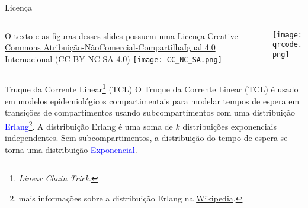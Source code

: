 \maketitle

\begin{frame}{Licença}
    \begin{columns}
        \begin{column}{0.5\textwidth}
            O texto e as figuras desses slides possuem uma
            \href{https://creativecommons.org/licenses/by-nc-sa/4.0/deed.pt}{Licença
            Creative Commons
            Atribuição-NãoComercial-CompartilhaIgual 4.0 Internacional (CC BY-NC-SA 4.0)}
            \vfill
            \centering
            \vspace{1em}
            \texttt{[image: CC\_NC\_SA.png]}
        \end{column}
        \begin{column}{0.5\textwidth}
            \centering
            \texttt{[image: qrcode.png]}
        \end{column}
    \end{columns}
    \vfill
\end{frame}

\begin{frame}{Truque da Corrente Linear\footnote{\textit{Linear Chain Trick}.} (TCL)}
	O Truque da Corrente Linear (TCL) \parencite{hurtadoGeneralizationsLinearChain2019, hurtadoProcedureDerivingNew2020, andoHowFastLinear2020}
	é usado em modelos epidemiológicos compartimentais para
	modelar tempos de espera em transições de compartimentos usando
	subcompartimentos com uma distribuição \textcolor{blue}{Erlang}\footnote{mais informações
	sobre a distribuição Erlang na \href{https://en.wikipedia.org/wiki/Erlang_distribution}{Wikipedia}.}.
	\vfill
	A distribuição Erlang é uma soma de $k$ distribuições exponenciais
	independentes.
	\vfill
	Sem subcompartimentos, a distribuição do tempo de espera se torna uma
	distribuição \textcolor{blue}{Exponencial}.
\end{frame}


